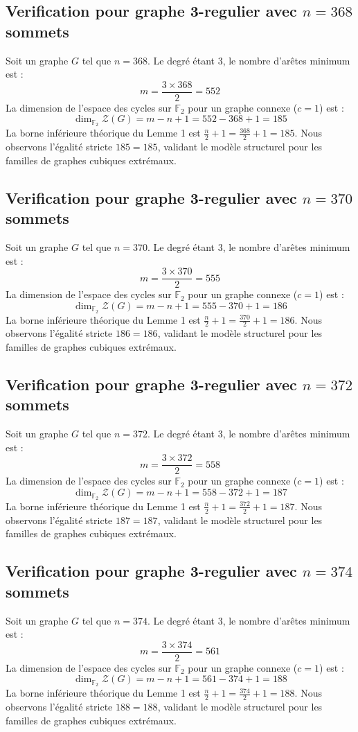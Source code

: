 \documentclass[11pt,a4paper]{article}
\begin{document}
\subsection{Verification pour graphe 3-regulier avec $n=368$ sommets}
Soit un graphe $G$ tel que $n = 368$. Le degré étant 3, le nombre d'arêtes minimum est :
$$ m = \frac{3 \times 368}{2} = 552 $$
La dimension de l'espace des cycles sur $\mathbb{F}_2$ pour un graphe connexe ($c=1$) est :
$$ \dim_{\mathbb{F}_2} \mathcal{Z}(G) = m - n + 1 = 552 - 368 + 1 = 185 $$
La borne inférieure théorique du Lemme 1 est $\frac{n}{2} + 1 = \frac{368}{2} + 1 = 185$.
Nous observons l'égalité stricte $185 = 185$, validant le modèle structurel pour les familles de graphes cubiques extrémaux.

\subsection{Verification pour graphe 3-regulier avec $n=370$ sommets}
Soit un graphe $G$ tel que $n = 370$. Le degré étant 3, le nombre d'arêtes minimum est :
$$ m = \frac{3 \times 370}{2} = 555 $$
La dimension de l'espace des cycles sur $\mathbb{F}_2$ pour un graphe connexe ($c=1$) est :
$$ \dim_{\mathbb{F}_2} \mathcal{Z}(G) = m - n + 1 = 555 - 370 + 1 = 186 $$
La borne inférieure théorique du Lemme 1 est $\frac{n}{2} + 1 = \frac{370}{2} + 1 = 186$.
Nous observons l'égalité stricte $186 = 186$, validant le modèle structurel pour les familles de graphes cubiques extrémaux.

\subsection{Verification pour graphe 3-regulier avec $n=372$ sommets}
Soit un graphe $G$ tel que $n = 372$. Le degré étant 3, le nombre d'arêtes minimum est :
$$ m = \frac{3 \times 372}{2} = 558 $$
La dimension de l'espace des cycles sur $\mathbb{F}_2$ pour un graphe connexe ($c=1$) est :
$$ \dim_{\mathbb{F}_2} \mathcal{Z}(G) = m - n + 1 = 558 - 372 + 1 = 187 $$
La borne inférieure théorique du Lemme 1 est $\frac{n}{2} + 1 = \frac{372}{2} + 1 = 187$.
Nous observons l'égalité stricte $187 = 187$, validant le modèle structurel pour les familles de graphes cubiques extrémaux.

\subsection{Verification pour graphe 3-regulier avec $n=374$ sommets}
Soit un graphe $G$ tel que $n = 374$. Le degré étant 3, le nombre d'arêtes minimum est :
$$ m = \frac{3 \times 374}{2} = 561 $$
La dimension de l'espace des cycles sur $\mathbb{F}_2$ pour un graphe connexe ($c=1$) est :
$$ \dim_{\mathbb{F}_2} \mathcal{Z}(G) = m - n + 1 = 561 - 374 + 1 = 188 $$
La borne inférieure théorique du Lemme 1 est $\frac{n}{2} + 1 = \frac{374}{2} + 1 = 188$.
Nous observons l'égalité stricte $188 = 188$, validant le modèle structurel pour les familles de graphes cubiques extrémaux.
\end{document}

